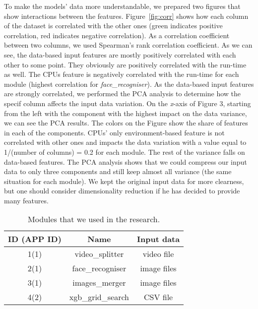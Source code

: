 To make the models' data more understandable, we prepared two figures that show interactions between the features. Figure~\ref{fig:corr} shows how each column of the dataset is correlated with the other ones (green indicates positive correlation, red indicates negative correlation). As a correlation coefficient between two columns, we used Spearman's rank correlation coefficient. As we can see, the data-based input features are mostly positively correlated with each other to some point. They obviously are positively correlated with the run-time as well. The CPUs feature is negatively correlated with the run-time for each module (highest correlation for \textit{face\_recogniser}). As the data-based input features are strongly correlated, we performed the PCA analysis to determine how the specif column affects the input data variation. On the \textit{x}-axis of Figure 3, starting from the left with the component with the highest impact on the data variance, we can see the PCA results. The colors on the Figure show the share of features in each of the components.  CPUs' only environment-based feature is not correlated with other ones and impacts the data variation with a value equal to 1/(number of columns) = 0.2 for each module. The rest of the variance falls on data-based features. The PCA analysis shows that we could compress our input data to only three components and still keep almost all variance (the same situation for each module). We kept the original input data for more clearness, but one should consider dimensionality reduction if he has decided to provide many features.

\begin{table}[hbt!]
	\centering
	\caption{\label{tab:modules}Modules that we used in the research.}
	\begin{tabular}{|c c c|} 
		\hline
		ID (APP ID) & Name & Input data \\ [0.5ex] 
		\hline\hline
		1(1) & video\_splitter & video file \\ 
		\hline
		2(1) & face\_recogniser & image files \\
		\hline
		3(1) & images\_merger & image files \\
		\hline
		4(2) & xgb\_grid\_search & CSV file \\
		\hline
	\end{tabular}
\end{table}
